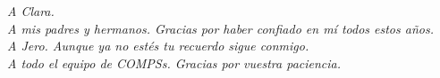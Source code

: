 \begin{center}
\textit{A Clara. }\\
\textit{A mis padres y hermanos. Gracias por haber confiado en mí todos estos años.}\\
\textit{A Jero. Aunque ya no estés tu recuerdo sigue conmigo.}\\
\textit{A todo el equipo de COMPSs. Gracias por vuestra paciencia.}
\end{center}
